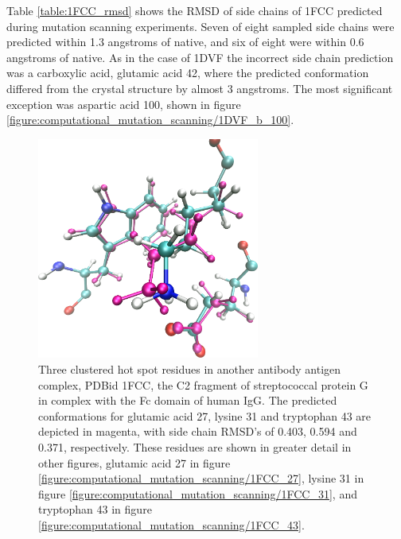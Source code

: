 

Table \ref{table:1FCC_rmsd} shows the RMSD of side chains of 1FCC predicted during mutation scanning experiments.
Seven of eight sampled side chains were predicted within 1.3 angstroms of native, and six of eight were within 0.6 angstroms of native.
As in the case of 1DVF the incorrect side chain prediction was a carboxylic acid, glutamic acid 42, where the predicted conformation differed from the crystal structure by almost 3 angstroms.
The most significant exception was aspartic acid 100, shown in figure \ref{figure:computational_mutation_scanning/1DVF_b_100}.


\begin{figure}[h]
  \centering
  \includegraphics[width=0.65\textwidth,height=0.3\textheight,keepaspectratio]{figures/mutation_side_chain_images/1fcc_27_31_43.png}
  \caption{Three clustered hot spot residues in another antibody antigen complex, PDBid 1FCC, the C2 fragment of streptococcal protein G in complex with the Fc domain of human IgG.
The predicted conformations for glutamic acid 27, lysine 31 and tryptophan 43 are depicted in magenta, with side chain RMSD's of 0.403, 0.594 and 0.371, respectively.
These residues are shown in greater detail in other figures, glutamic acid 27 in figure \protect\ref{figure:computational_mutation_scanning/1FCC_27}, lysine 31 in figure \protect\ref{figure:computational_mutation_scanning/1FCC_31}, and tryptophan 43 in figure \protect\ref{figure:computational_mutation_scanning/1FCC_43}.}
  \label{figure:computational_mutation_scanning/1FCC_27_31_43}
\end{figure}

